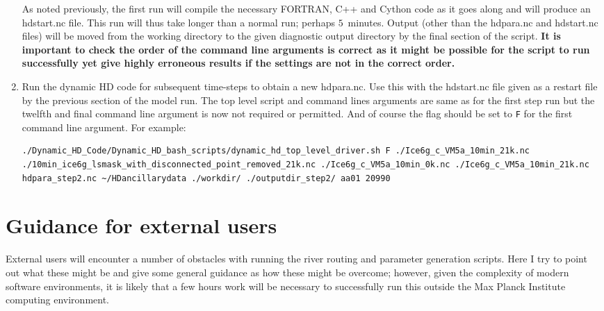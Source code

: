 \documentclass{article}
\begin{document}
\begin{enumerate}
\begin{lstlisting}[style=bash_input,breaklines=true]
\end{lstlisting}
As noted previously, the first run will compile the necessary FORTRAN, C++ and Cython code as it goes along and will produce an hdstart.nc file. This run will thus take longer than a normal run; perhaps $5$~minutes. Output (other than the hdpara.nc and hdstart.nc files) will be moved from the working directory to the given diagnostic output directory by the final section of the script. \textbf{It is important to check the order of the command line arguments is correct as it might be possible for the script to run successfully yet give highly erroneous results if the settings are not in the correct order.} 
\item Run the dynamic HD code for subsequent time-steps to obtain a new hdpara.nc. Use this with the hdstart.nc file given as a restart file by the previous section of the model run. The top level script and command lines arguments are same as for the first step run but the twelfth and final command line argument is now not required or permitted. And of course the flag should be set to \texttt{F} for the first command line argument. For example:
\begin{lstlisting}[style=bash_input,breaklines=true]
./Dynamic_HD_Code/Dynamic_HD_bash_scripts/dynamic_hd_top_level_driver.sh F ./Ice6g_c_VM5a_10min_21k.nc ./10min_ice6g_lsmask_with_disconnected_point_removed_21k.nc ./Ice6g_c_VM5a_10min_0k.nc ./Ice6g_c_VM5a_10min_21k.nc hdpara_step2.nc ~/HDancillarydata ./workdir/ ./outputdir_step2/ aa01 20990
\end{lstlisting}
\end{enumerate}
\section{Guidance for external users} \label{section-external-instructions}

External users will encounter a number of obstacles with running the river routing and parameter generation scripts. Here I try to point out what these might be and give some general guidance as how these might be overcome; however, given the complexity of modern software environments, it is likely that a few hours work will be necessary to successfully run this outside the Max Planck Institute computing environment.
\end{document}
